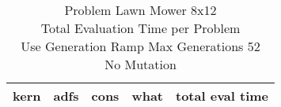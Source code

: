 \begin{table}[H]
\caption{Problem  Lawn Mower 8x12\\Total Evaluation Time per Problem \\ Use Generation Ramp  Max Generations 52\\ No Mutation \\}
\begin{center}
\scalebox{1.0} %
{
\begin{tabular}{llllr}
\hline
kern & adfs & cons & what & total eval time \\
\hline


\end{tabular}
}
\end{center}
\end{table}

